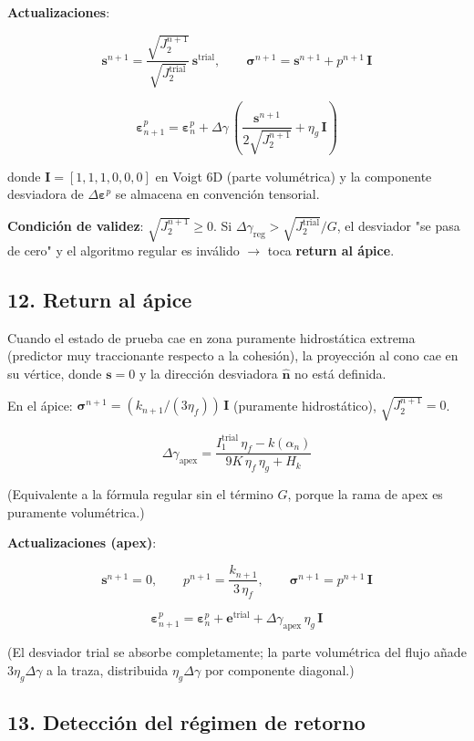 \documentclass[11pt,letterpaper,oneside]{report}
\begin{document}
\textbf{Actualizaciones}:

\[
\mathbf s^{n+1} = \frac{\sqrt{J_2^{n+1}}}{\sqrt{J_2^\text{trial}}}\,\mathbf s^\text{trial}, \qquad \boldsymbol\sigma^{n+1} = \mathbf s^{n+1} + p^{n+1}\,\mathbf I
\]

\[
\boldsymbol\varepsilon^p_{n+1} = \boldsymbol\varepsilon^p_n + \Delta\gamma\,\left(\frac{\mathbf s^{n+1}}{2\sqrt{J_2^{n+1}}} + \eta_g\,\mathbf I\right)
\]

donde $\mathbf I = [1,1,1,0,0,0]$ en Voigt 6D (parte volumétrica) y la componente desviadora de $\Delta\boldsymbol\varepsilon^p$ se almacena en convención tensorial.

\textbf{Condición de validez}: $\sqrt{J_2^{n+1}} \geq 0$. Si $\Delta\gamma_\text{reg} > \sqrt{J_2^\text{trial}}/G$, el desviador "se pasa de cero" y el algoritmo regular es inválido \ensuremath{\to} toca \textbf{return al ápice}.

\subsection{12. Return al ápice}

Cuando el estado de prueba cae en zona puramente hidrostática extrema (predictor muy traccionante respecto a la cohesión), la proyección al cono cae en su vértice, donde $\mathbf s = 0$ y la dirección desviadora $\hat{\mathbf n}$ no está definida.

En el ápice: $\boldsymbol\sigma^{n+1} = (k_{n+1}/(3\eta_f))\,\mathbf I$ (puramente hidrostático), $\sqrt{J_2^{n+1}} = 0$.

\[
\boxed{\;\Delta\gamma_\text{apex} = \frac{I_1^\text{trial}\,\eta_f - k(\alpha_n)}{9K\,\eta_f\,\eta_g + H_k}\;}
\]

(Equivalente a la fórmula regular sin el término $G$, porque la rama de apex es puramente volumétrica.)

\textbf{Actualizaciones (apex)}:

\[
\mathbf s^{n+1} = 0,\qquad p^{n+1} = \frac{k_{n+1}}{3\,\eta_f}, \qquad \boldsymbol\sigma^{n+1} = p^{n+1}\,\mathbf I
\]

\[
\boldsymbol\varepsilon^p_{n+1} = \boldsymbol\varepsilon^p_n + \mathbf e^\text{trial} + \Delta\gamma_\text{apex}\,\eta_g\,\mathbf I
\]

(El desviador trial se absorbe completamente; la parte volumétrica del flujo añade $3\eta_g\Delta\gamma$ a la traza, distribuida $\eta_g\Delta\gamma$ por componente diagonal.)

\subsection{13. Detección del régimen de retorno}
\end{document}
